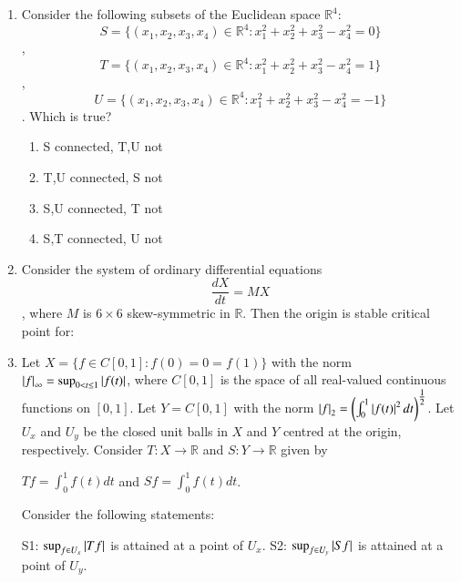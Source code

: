 \documentclass[journal,12pt,onecolumn]{IEEEtran}
\theoremstyle{remark}
\begin{document}
\begin{enumerate}
\item Consider the following subsets of the Euclidean space $\mathbb{R}^4:$
$$S=\{(x_1,x_2,x_3,x_4)\in\mathbb{R}^4\colon x_1^2+x_2^2+x_3^2-x_4^2=0\}$$,  
$$T=\{(x_1,x_2,x_3,x_4)\in\mathbb{R}^4\colon x_1^2+x_2^2+x_3^2-x_4^2=1\}$$, $$U=\{(x_1,x_2,x_3,x_4)\in\mathbb{R}^4\colon x_1^2+x_2^2+x_3^2-x_4^2=-1\}$$. Which is true?

\begin{enumerate}
\item S connected, T,U not  
\item T,U connected, S not  
\item S,U connected, T not  
\item S,T connected, U not  
\end{enumerate}
\hfill{}

\item Consider the system of ordinary differential equations
$$\frac{dX}{dt}=MX$$, where $M$ is $6\times 6$ skew-symmetric in $\mathbb{R}$. Then the origin is stable critical point for:

\begin{enumerate}
\end{enumerate}
\hfill{}


\item Let $X = \{ f \in C[0, 1] : f(0) = 0 = f(1)\}$ with the norm $\left\vert f\right\vert_\infty = \sup_{0 < t \leq 1} \left\vert f(t)\right\vert$, where $C[0,1]$ is the space of all real-valued continuous functions on $[0,1]$.  
Let $Y = C[0, 1]$ with the norm $\left\vert f\right\vert_2 = \left(\int_0^1 \left\vert f(t)\right\vert^2 dt\right)^{\tfrac{1}{2}}$.  
Let $U_x$ and $U_y$ be the closed unit balls in $X$ and $Y$ centred at the origin, respectively. Consider $T: X \to \mathbb{R}$ and $S: Y \to \mathbb{R}$ given by  

$Tf = \int_0^1 f(t) dt$ and $Sf = \int_0^1 f(t) dt$.  

Consider the following statements:

S1: $\sup_{f \in U_x} \left\vert Tf\right\vert$ is attained at a point of $U_x$.  
S2: $\sup_{f \in U_y} \left\vert Sf\right\vert$ is attained at a point of $U_y$.  


\end{enumerate}
\end{document}
